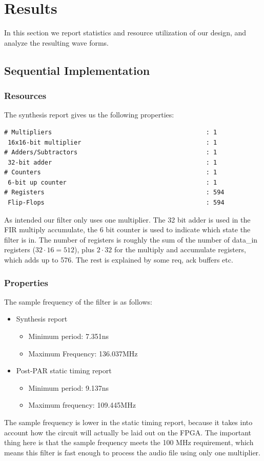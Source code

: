 \section{Results}
In this section we report statistics and resource utilization of our design, and analyze the resulting wave forms.
\subsection{Sequential Implementation}
\subsubsection{Resources}
The synthesis report gives us the following properties:
\begin{verbatim}
# Multipliers                                          : 1
 16x16-bit multiplier                                  : 1
# Adders/Subtractors                                   : 1
 32-bit adder                                          : 1
# Counters                                             : 1
 6-bit up counter                                      : 1
# Registers                                            : 594
 Flip-Flops                                            : 594
\end{verbatim}
As intended our filter only uses one multiplier. The 32 bit adder is used in the FIR multiply accumulate, the 6 bit counter is used to indicate which state the filter is in. The number of registers is roughly the sum of the number of data\_in registers ($32 \cdot 16 = 512$), plus $2 \cdot 32$ for the multiply and accumulate registers, which adds up to 576. The rest is explained by some req, ack buffers etc. 
\subsubsection{Properties}
The sample frequency of the filter is as follows:
\begin{itemize}
\item
Synthesis report
\begin{itemize}
\item Minimum period: 7.351ns
\item Maximum Frequency: 136.037MHz
\end{itemize}
\item
Post-PAR static timing report
\begin{itemize}
\item  Minimum period:   9.137ns  
\item Maximum frequency: 109.445MHz
\end{itemize}
\end{itemize}
The sample frequency is lower in the static timing report, because it takes into account how the circuit will actually be laid out on the FPGA. The important thing here is that the sample frequency meets the 100 MHz requirement, which means this filter is fast enough to process the audio file using only one multiplier.
